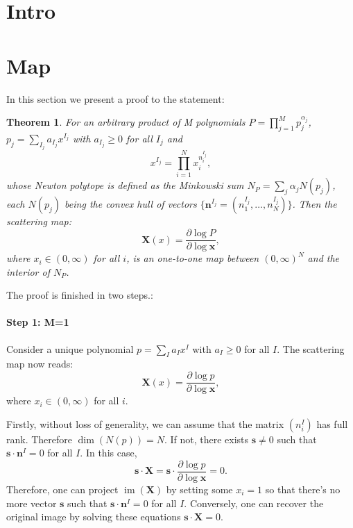 \documentclass[12pt]{article}
\theoremstyle{definition}
\theoremstyle{plain}
\newtheorem{thm}[para]{Theorem}
\begin{document}
\section{Intro}

\section{Map}

In this section we present a proof to the statement:
\begin{thm}
For an arbitrary product of M polynomials $P=\prod_{j=1}^M p_j^{\alpha_j}$, $p_j=\sum_{I_j} a_{I_j} x^{I_j}$ with $a_{I_j}\geq 0$ for all $I_j$ and
 \[
	x^{I_j}=\prod_{i=1}^N x_i^{n^{I_j}_i},
\]
whose Newton polytope is defined as the Minkowski sum  $N_P=\sum_j \alpha_j N(p_j)$, each $N(p_j)$ being the convex hull of vectors $\{\mathbf{n}^{I_j}=(n^{I_j}_1,\dots,n^{I_j}_N)\}$. Then the scattering map:
\[
	\mathbf X(x)=\frac{\partial \log P}{\partial \log \mathbf x},
\]
where $x_i\in (0,\infty)$ for all $i$, is an one-to-one map between $(0,\infty)^N$ and the interior of $N_P$. 

\end{thm}

The proof is finished in two steps.:
\paragraph{Step 1: M=1}
Consider a unique polynomial $p=\sum_{I} a_I x^I$ with $a_I\geq 0$ for all $I$. The scattering map now reads:
\[
	\mathbf X(x)=\frac{\partial \log p}{\partial \log \mathbf x},
\]
where $x_i\in (0,\infty)$ for all $i$.

Firstly, without loss of generality, we can assume that the matrix $(n_i^I)$ has full rank. Therefore $\dim (N(p))=N$. If not, there exists $\mathbf s\neq 0$ such that $\mathbf s \cdot \mathbf n^I=0$ for all $I$. In this case,
\[
	\mathbf s\cdot\mathbf X=\mathbf s\cdot\frac{\partial \log p}{\partial \log \mathbf x}=0.
\]
Therefore, one can project $\operatorname{im}(\mathbf X)$ by setting some $x_i=1$ so that there's no more vector $\mathbf s$ such that $\mathbf s\cdot \mathbf n^I=0$ for all $I$. Conversely, one can recover the original image by solving these equations $\mathbf s\cdot\mathbf X=0$. 
\end{document}

